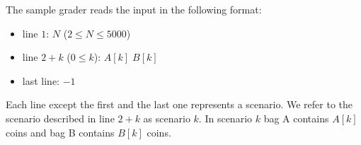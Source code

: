 The sample grader reads the input in the following format:
\begin{itemize}
    \item  line $1$: $N$ ($2 \le N \le 5000$)
\item line $2 + k$ ($0 \le k$): $A[k] \; B[k]$
\item last line: $-1$

\end{itemize}

Each line except the first and the last one represents a scenario.
We refer to the scenario described in line $2 + k$ as scenario $k$.
In scenario $k$ bag A contains $A[k]$ coins and bag B contains $B[k]$ coins.

